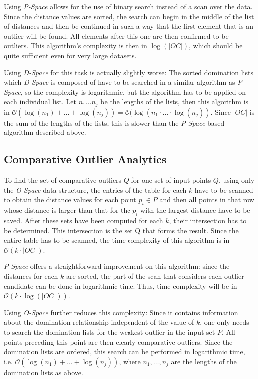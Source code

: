 \documentclass[runningheads]{llncs}
\begin{document}
Using \emph{P-Space} allows for the use of binary search instead of a scan over the data. Since the distance values are sorted, the search can begin in the middle of the list of distances and then be continued in such a way that the first element that is an outlier will be found. All elements after this one are then confirmed to be outliers. This algorithm's complexity is then in $\log(|OC|)$, which should be quite sufficient even for very large datasets.

Using \emph{D-Space} for this task is actually slightly worse: The sorted domination lists which \emph{D-Space} is composed of have to be searched in a similar algorithm as \emph{P-Space}, so the complexity is logarithmic, but the algorithm has to be applied on each individual list. Let $n_1 \ldots n_j$ be the lengths of the lists, then this algorithm is in $\mathcal{O}(\log(n_1) + \ldots + \log(n_j)) = \mathcal{O}(\log(n_1 \cdot \ldots \cdot \log(n_j))$. Since $|OC|$ is the sum of the lengths of the lists, this is slower than the \emph{P-Space}-based algorithm described above.
\subsection{Comparative Outlier Analytics}

To find the set of comparative outliers $Q$ for one set of input points $Q$, using only the \emph{O-Space} data structure, the entries of the table for each $k$ have to be scanned to obtain the distance values for each point $p_i\in P$ and then all points in that row whose distance is larger than that for the $p_i$ with the largest distance have to be saved. After these sets have been computed for each $k$, their intersection has to be determined. This intersection is the set Q that forms the result. Since the entire table has to be scanned, the time complexity of this algorithm is in $\mathcal{O}(k\cdot |OC|)$.

\emph{P-Space} offers a straightforward improvement on this algorithm: since the distances for each $k$ are sorted, the part of the scan that considers each outlier candidate can be done in logarithmic time. Thus, time complexity will be in $\mathcal{O}(k\cdot \log(|OC|))$.

Using \emph{O-Space} further reduces this complexity: Since it contains information about the domination relationship independent of the value of $k$, one only needs to search the domination lists for the weakest outlier in the input set $P$. All points preceding this point are then clearly comparative outliers. Since the domination lists are ordered, this search can be performed in logarithmic time, i.e. $\mathcal{O}(\log(n_1) + \ldots + \log(n_j))$, where $n_1, \ldots , n_j$ are the lengths of the domination lists as above.
\end{document}
